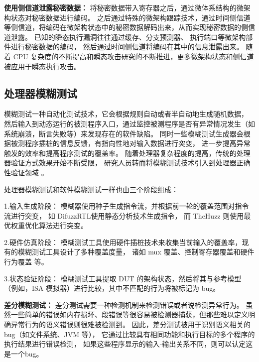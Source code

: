 \textbf{使用侧信道泄露秘密数据：}
将秘密数据带入寄存器之后，通过微体系结构的微架构状态对秘密数据进行编码。
之后通过特殊的微架构跟踪技术，通过时间侧信道等侧信道，将编码在微架构状态中的秘密数据解码出来，从而实现秘密数据的侧信道泄露。
已知的瞬态执行漏洞往往通过缓存\cite{yarom2014flush+}、分支预测器\cite{evtyushkin2018branchscope}、
执行端口\cite{bhattacharyya2019smotherspectre}等微架构部件进行秘密数据的编码，
然后通过时间侧信道将编码在其中的信息泄露出来。
随着 CPU 复杂度的不断提高和瞬态攻击研究的不断推进，更多微架构状态和侧信道被应用于瞬态执行攻击。\par

\subsection{处理器模糊测试}

模糊测试一种自动化测试技术，它会根据规则自动或者半自动地生成随机数据，
然后输入到动态运行的被测程序入口，通过监控被测程序是否有异常情况发生（如系统崩溃，断言失败等）来发现存在的软件缺陷。
同时一些模糊测试生成器会根据被测程序插桩的信息反馈，有指向性地对输入数据进行突变，
进一步提高异常触发的效率和提高程序测试的覆盖率。
随着处理器复杂程度的提高，传统的处理器验证方式效果开始不断受限，
研究人员转而将模糊测试技术引入到处理器正确性验证领域 
\cite{bruns2022efficient}\cite{canakci2021directfuzz}\cite{hur2021difuzzrtl}。\par

处理器模糊测试和软件模糊测试一样也由三个阶段组成：\par

1.输入生成阶段：
模糊器使用种子生成指令流，并根据前一轮的覆盖范围对指令流进行突变，
如 DifuzzRTL\cite{hur2021difuzzrtl}使用静态分析技术生成指令，
而 TheHuzz\cite{kande2022thehuzz} 则使用最优权重优化算法进行突变。\par

2.硬件仿真阶段：
模糊测试工具使用硬件插桩技术来收集当前输入的覆盖率，现有的模糊测试工具设计了多种覆盖度量，
诸如 mux 覆盖\cite{laeufer2018rfuzz}、控制寄存器覆盖\cite{hur2021difuzzrtl}和硬件行为覆盖\cite{kande2022thehuzz} 等。\par

3.状态验证阶段：
模糊测试工具提取 DUT 的架构状态，然后将其与参考模型（例如，ISA 模拟器）进行比较，其中不匹配的行为将被标记为 bug。\par

\par

\textbf{差分模糊测试：}
差分测试需要一种检测机制来检测错误或者说检测异常行为。
虽然一些简单的错误如内存损坏、段错误等很容易被检测器捕获，但那些难以定义明确异常行为的语义错误则很难被检测到。
因此，差分测试被用于识别语义相关的 bug（如文件系统\cite{min2015cross}、JVM\cite{chen2019deep} 等），
它通过比较具有相同功能和执行目标的多个程序的执行结果进行错误检测，
如果这些程序显示的输入-输出关系不同，则可以认定这是一个bug。\par

